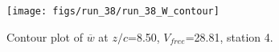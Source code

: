 \begin{figure}[H]
\centering
\texttt{[image: figs/run\_38/run\_38\_W\_contour]}
\caption{Contour plot of $\overline{w}$ at $z/c$=8.50, $V_{free}$=28.81, station 4.}
\label{fig:run_38_W_contour}
\end{figure}


